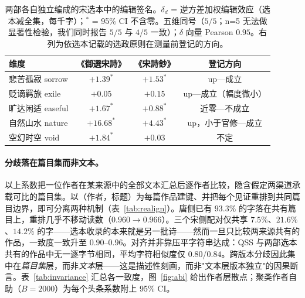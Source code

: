 \documentclass[11pt]{article}
\begin{document}
\begin{table}[H]
\centering\small
\caption{两部各自独立编成的宋选本中的编辑签名。$\delta_d$ = 逆方差加权编辑效应（选本减全集，每千字）；$^*$ = 95\% CI 不含零。五维同号（$5/5$；n=5 无法做显著性检验，我们同时报告 $5/5$ 与 $4/5$ 一致）；$\delta$ 向量 Pearson $0.95$。右列为依选本记载的选政原则在测量前登记的方向。}
\label{tab:rep}
\begin{tabular}{lccc}
\toprule
维度 & 《御選宋詩》 & 《宋詩鈔》 & 登记方向\\
\midrule
悲苦孤寂 sorrow & $+1.39^*$ & $+1.53^*$ & up—成立\\
贬谪羁旅 exile & $+0.05$ & $+0.15$ & up—成立（幅度微小）\\
旷达闲适 easeful & $+1.67^*$ & $+0.88^*$ & 近零—不成立\\
自然山水 nature & $+16.68^*$ & $+4.43^*$ & up，小于官修—成立\\
空幻时空 void & $+1.84^*$ & $+0.03$ & 不定\\
\bottomrule
\end{tabular}
\end{table}

\paragraph{分歧落在篇目集而非文本。}以上系数把一位作者在某来源中的全部文本汇总后逐作者比较，隐含假定两渠道承载可比的篇目集。以（作者，标题）为每篇作品建键、并把每个见证重排到共同篇目边界，即可分离两种机制（表~\ref{tab:realign}）。唐侧已有 $93.3\%$ 的字落在共有篇目上，重排几乎不移动读数（$0.960\to0.966$）。三个宋侧配对仅共享 $7.5\%$、$21.6\%$、$14.2\%$ 的字——选本收录的本来就是另一批诗——然而一旦只比较两来源共有的作品，一致度一致升至 $0.90$–$0.96$。对齐并非靠压平字符串达成：QSS 与两部选本共有的作品中无一逐字节相同，平均字符相似度仅 $0.80$/$0.84$。跨版本分歧因此集中在\emph{篇目集}层，而非\emph{文本}层——这是描述性刻画，而非"文本层版本独立"的因果断言。表~\ref{tab:invariance} 汇总各一致度，图~\ref{fig:abi} 给出作者层散点；聚类作者自助（$B{=}2000$）为每个头条系数附上 95\% CI。
\end{document}
